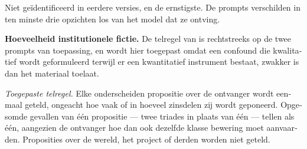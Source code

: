 \begin{dutch}
Niet geïdentificeerd in eerdere versies, en de ernstigste. De prompts verschilden in ten minste drie opzichten los van het model dat ze ontving.

\textbf{Hoeveelheid institutionele fictie.} De telregel van  is rechtstreeks op de twee prompts van toepassing, en wordt hier toegepast omdat een confound die kwalitatief wordt geformuleerd terwijl er een kwantitatief instrument bestaat, zwakker is dan het materiaal toelaat.

\emph{Toegepaste telregel.} Elke onderscheiden propositie over de ontvanger wordt eenmaal geteld, ongeacht hoe vaak of in hoeveel zinsdelen zij wordt geponeerd. Opgesomde gevallen van één propositie — twee triades in plaats van één — tellen als één, aangezien de ontvanger hoe dan ook dezelfde klasse bewering moet aanvaarden. Proposities over de wereld, het project of derden worden niet geteld.


\end{dutch}

